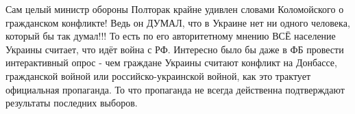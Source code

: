  
 
 
 
 

\begin{cmtfront}

Сам целый министр обороны Полторак крайне удивлен словами Коломойского о
гражданском конфликте! Ведь он ДУМАЛ, что в Украине нет ни одного
человека, который бы так думал!!! То есть по его авторитетному мнению
ВСЁ население Украины считает, что идёт война с РФ. Интересно было бы
даже в ФБ провести интерактивный опрос - чем граждане Украины считают
конфликт на Донбассе, гражданской войной или российско-украинской
войной, как это трактует официальная пропаганда. То что пропаганда не
всегда действенна подтверждают результаты последних выборов.
	
\end{cmtfront}

